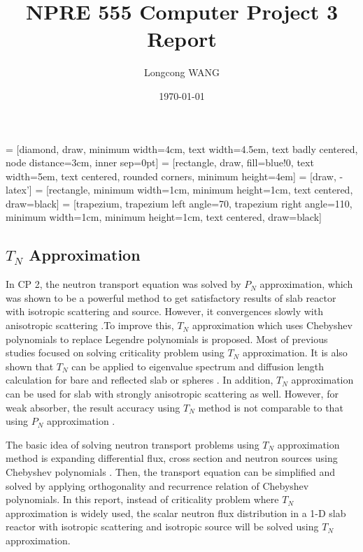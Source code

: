 \documentclass[11pt]{article}
\begin{document}
 = [diamond, draw, minimum width=4cm, 
    text width=4.5em, text badly centered, node distance=3cm, inner sep=0pt]
 = [rectangle, draw, fill=blue!0, 
    text width=5em, text centered, rounded corners, minimum height=4em]
 = [draw, -latex']
 = [rectangle, minimum width=1cm, minimum height=1cm, 
text centered, draw=black]
 = [trapezium, trapezium left angle=70, trapezium right angle=110, 
minimum width=1cm, minimum height=1cm, text centered, draw=black]
\begin{spacing}{1.5}
\title{NPRE 555 Computer Project 3 Report }
\author {Longcong WANG}
\date {\today}
\maketitle
\newpage
\tableofcontents
\listoffigures
\newpage
\section{$T_N$ Approximation}
In CP 2, the neutron transport equation was solved by $P_N$ approximation, which was shown to be a powerful method to get satisfactory results of slab reactor with isotropic scattering and source. However, it convergences slowly with anisotropic scattering \cite{anli2006tn}.To improve this, $T_N$ approximation which uses Chebyshev polynomials to replace Legendre polynomials is proposed. Most of previous studies focused on solving criticality problem using $T_N$ approximation. It is also shown that $T_N$ can be applied to eigenvalue spectrum and diffusion length calculation for bare and reflected slab or spheres \cite{okkecs2015diffusion}. In addition, $T_N$ approximation can be used for slab with strongly anisotropic scattering \cite{yilmazer2007solution} as well. However, for weak absorber, the result accuracy using $T_N$ method is not comparable to that using $P_N$ approximation \cite{anli2006tn}.\par
The basic idea of solving neutron transport problems using $T_N$ approximation method is expanding differential flux, cross section and neutron sources using Chebyshev polynomials \cite{anli2006tn}. Then, the transport equation can be simplified and solved by applying orthogonality and recurrence relation of Chebyshev polynomials. In this report, instead of criticality problem where $T_N$ approximation is widely used, the scalar neutron flux distribution in a 1-D slab reactor with isotropic scattering and isotropic source will be solved using $T_N$ approximation.\par


\end{spacing}
\end{document}
